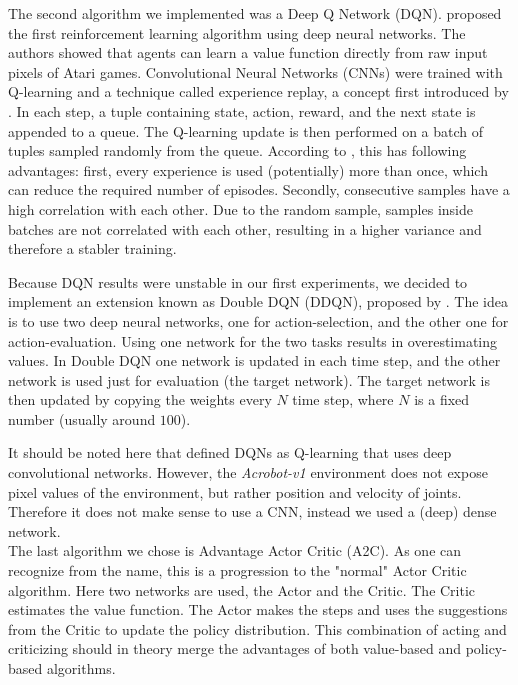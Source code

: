 \documentclass[11pt,a4paper]{article}
\begin{document}
The second algorithm we implemented was a Deep Q Network (DQN). \cite{mnih2013playing} proposed the first reinforcement learning algorithm using deep neural networks. The authors showed that agents can learn a value function directly from raw input pixels of Atari games. Convolutional Neural Networks (CNNs) were trained with Q-learning and a technique called experience replay, a concept first introduced by \cite{lin1992self} . In each step, a tuple containing state, action, reward, and the next state is appended to a queue. The Q-learning update is then performed on a batch of tuples sampled randomly from the queue. According to \cite{sutton2018reinforcement}, this has following advantages: first, every experience is used (potentially) more than once, which can reduce the required number of episodes. Secondly, consecutive samples have a high correlation with each other. Due to the random sample, samples inside batches are not correlated with each other, resulting in a higher variance and therefore a stabler training. 

Because DQN results were unstable in our first experiments, we decided to implement an extension known as Double DQN (DDQN), proposed by \cite{van2016deep}. The idea is to use two deep neural networks, one for action-selection, and the other one for action-evaluation. Using one network for the two tasks results in overestimating values. In Double DQN one network is updated in each time step, and the other network is used just for evaluation (the target network). The target network is then updated by copying the weights every $N$ time step, where $N$ is a fixed number (usually around $100$).

It should be noted here that \cite{mnih2013playing} defined DQNs as Q-learning that uses deep convolutional networks. However, the \textit{Acrobot-v1} environment does not expose pixel values of the environment, but rather position and velocity of joints. Therefore it does not make sense to use a CNN, instead we used a (deep) dense network. \\

The last algorithm we chose is Advantage Actor Critic (A2C). As one can recognize from the name, this is a progression to the "normal" Actor Critic algorithm. Here two networks are used, the Actor and the Critic. The Critic estimates the value function. The Actor makes the steps and uses the suggestions from the Critic to update the policy distribution. This combination of acting and criticizing should in theory merge the advantages of both value-based and policy-based algorithms.
\end{document}
